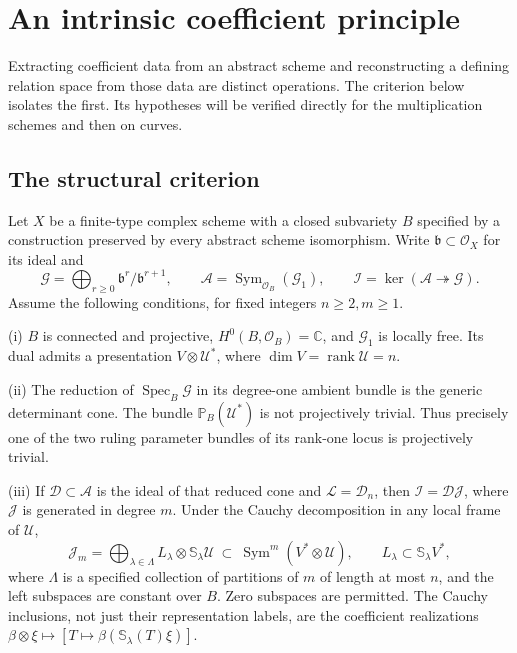 \documentclass[11pt,reqno]{amsart}
\numberwithin{equation}{section}
\theoremstyle{definition}\newtheorem{definition}[theorem]{Definition}
\theoremstyle{remark}\newtheorem{remark}[theorem]{Remark}
\newcommand{\C}{\mathbb C}\newcommand{\Q}{\mathbb Q}
\newcommand{\Pj}{\mathbb P}\newcommand{\A}{\mathbb A}
\newcommand{\OO}{\mathcal O}\newcommand{\II}{\mathcal I}
\DeclareMathOperator{\Sym}{Sym}\DeclareMathOperator{\Gr}{Gr}
\DeclareMathOperator{\rank}{rank}\DeclareMathOperator{\Proj}{Proj}
\DeclareMathOperator{\Spec}{Spec}\DeclareMathOperator{\PGL}{PGL}
\begin{document}
\section{An intrinsic coefficient principle}
\label{sec:structural-coefficient-principle}

Extracting coefficient data from an abstract scheme and reconstructing
a defining relation space from those data are distinct operations.
The criterion below isolates the first.  Its hypotheses will be
verified directly for the multiplication schemes and then on curves.

\subsection{The structural criterion}

Let \(X\) be a finite-type complex scheme with a closed subvariety
\(B\) specified by a construction preserved by every abstract scheme
isomorphism.  Write \(\mathfrak b\subset\OO_X\) for its ideal and
\[
 \mathcal G=\bigoplus_{r\ge0}\mathfrak b^r/\mathfrak b^{r+1},
 \qquad \mathcal A=\Sym_{\OO_B}(\mathcal G_1),
 \qquad \mathcal I=\ker(\mathcal A\twoheadrightarrow\mathcal G).
\]
Assume the following conditions, for fixed integers \(n\ge2,m\ge1\).

\smallskip
\noindent\textup{(i)} \(B\) is connected and projective,
\(H^0(B,\OO_B)=\C\), and \(\mathcal G_1\) is locally free.
Its dual admits a presentation \(V\otimes\mathcal U^*\), where
\(\dim V=\rank\mathcal U=n\).

\smallskip
\noindent\textup{(ii)} The reduction of \(\Spec_B\mathcal G\)
in its degree-one ambient bundle is the generic determinant cone.
The bundle \(\Pj_B(\mathcal U^*)\) is not projectively trivial.
Thus precisely one of the two ruling parameter bundles of its rank-one
locus is projectively trivial.

\smallskip
\noindent\textup{(iii)} If \(\mathcal D\subset\mathcal A\)
is the ideal of that reduced cone and \(\mathcal L=\mathcal D_n\),
then \(\mathcal I=\mathcal D\mathcal J\), where
\(\mathcal J\) is generated in degree \(m\).  Under the Cauchy
decomposition in any local frame of \(\mathcal U\),
\begin{equation}\label{eq:structural-coefficient-hypothesis}
 \mathcal J_m=
 \bigoplus_{\lambda\in\Lambda}
          L_\lambda\otimes\mathbb S_\lambda\mathcal U
 \ \subset\
 \Sym^m(V^*\otimes\mathcal U),
 \qquad L_\lambda\subset\mathbb S_\lambda V^*,
\end{equation}
where \(\Lambda\) is a specified collection of partitions of \(m\)
of length at most \(n\), and the left subspaces are constant over
\(B\).  Zero subspaces are permitted.  The Cauchy inclusions, not
just their representation labels, are the coefficient realizations
\(\beta\otimes\xi\mapsto[T\mapsto\beta(\mathbb S_\lambda(T)\xi)]\).
\end{document}
